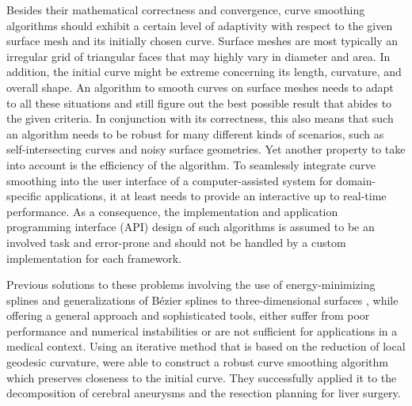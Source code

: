 \documentclass{stdlocal}
\begin{document}
Besides their mathematical correctness and convergence, curve smoothing algorithms should exhibit a certain level of adaptivity with respect to the given surface mesh and its initially chosen curve.
Surface meshes are most typically an irregular grid of triangular faces that may highly vary in diameter and area.
In addition, the initial curve might be extreme concerning its length, curvature, and overall shape.
An algorithm to smooth curves on surface meshes needs to adapt to all these situations and still figure out the best possible result that abides to the given criteria.
In conjunction with its correctness, this also means that such an algorithm needs to be robust for many different kinds of scenarios, such as self-intersecting curves and noisy surface geometries.
Yet another property to take into account is the efficiency of the algorithm.
To seamlessly integrate curve smoothing into the user interface of a computer-assisted system for domain-specific applications, it at least needs to provide an interactive up to real-time performance.
As a consequence, the implementation and application programming interface (API) design of such algorithms is assumed to be an involved task and error-prone and should not be handled by a custom implementation for each framework. \\
\autocite{lawonn2014}

Previous solutions to these problems involving the use of energy-minimizing splines \autocite{hofer2004} and generalizations of Bézier splines to three-dimensional surfaces \autocite{martinez2007,mancinelli2022}, while offering a general approach and sophisticated tools, either suffer from poor performance and numerical instabilities or are not sufficient for applications in a medical context.
Using an iterative method that is based on the reduction of local geodesic curvature, \textcite{lawonn2014} were able to construct a robust curve smoothing algorithm which preserves closeness to the initial curve.
They successfully applied it to the decomposition of cerebral aneurysms and the resection planning for liver surgery.
\end{document}
